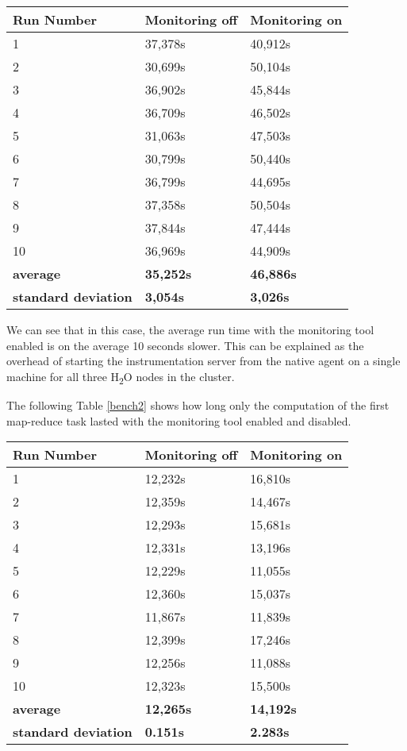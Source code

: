 \begin{center}
	\begin{tabular}{ l l l }
		\hline
		Run Number & Monitoring off & Monitoring on \\ \hline
1 & 37,378s	& 40,912s	\\
2 & 30,699s & 50,104s	\\
3 & 36,902s & 45,844s	\\
4 & 36,709s	& 46,502s	\\
5 & 31,063s	& 47,503s	\\
6 & 30,799s &	50,440s	\\
7 & 36,799s &	44,695s	\\
8 & 37,358s	& 50,504s	\\
9 & 37,844s	& 47,444s	\\
10 & 36,969s	& 44,909s	\\
  \hline  
\textbf{average} & \textbf{35,252s} & \textbf{46,886s} \\
\textbf{standard deviation} & \textbf{3,054s} & \textbf{3,026s} \\
	\end{tabular}
	\label{bench1}
\end{center}
We can see that in this case, the average run time with the monitoring tool enabled is on the average 10 seconds slower. This can be explained as the overhead of starting the instrumentation server from the native agent on a single machine for all three H\textsubscript{2}O nodes in the cluster.

The following Table \ref{bench2} shows how long only the computation of the first map-reduce task lasted with the monitoring tool enabled and disabled.

\begin{center}
	\begin{tabular}{ l l l }
		\hline
		Run Number & Monitoring off & Monitoring on \\ \hline
1	&12,232s&	16,810s  \\ 
2 	&12,359s &	14,467s \\ 
3	&12,293s &	15,681s \\ 
4	&12,331s &	13,196s \\ 
5	&12,229s &	11,055s \\ 
6	&12,360s &	15,037s \\ 
7 &	11,867s	&11,839s  \\ 
8	 &	12,399s &17,246s  \\ 
9&	12,256s 	&11,088s  \\ 
10	&12,323s &	15,500s \\ 

		\hline  
		\textbf{average} & \textbf{12,265s} & \textbf{14,192s} \\
		\textbf{standard deviation} & \textbf{0.151s} & \textbf{2.283s} \\
	\end{tabular}
	\label{bench2}
\end{center}

